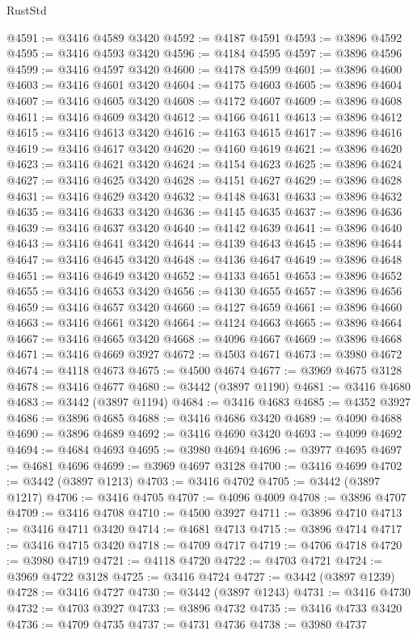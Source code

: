 \begin{lexlean}{RustStd}
\begin{coremodule}
@4591 := @3416 @4589 @3420
@4592 := @4187 @4591
@4593 := @3896 @4592
@4595 := @3416 @4593 @3420
@4596 := @4184 @4595
@4597 := @3896 @4596
@4599 := @3416 @4597 @3420
@4600 := @4178 @4599
@4601 := @3896 @4600
@4603 := @3416 @4601 @3420
@4604 := @4175 @4603
@4605 := @3896 @4604
@4607 := @3416 @4605 @3420
@4608 := @4172 @4607
@4609 := @3896 @4608
@4611 := @3416 @4609 @3420
@4612 := @4166 @4611
@4613 := @3896 @4612
@4615 := @3416 @4613 @3420
@4616 := @4163 @4615
@4617 := @3896 @4616
@4619 := @3416 @4617 @3420
@4620 := @4160 @4619
@4621 := @3896 @4620
@4623 := @3416 @4621 @3420
@4624 := @4154 @4623
@4625 := @3896 @4624
@4627 := @3416 @4625 @3420
@4628 := @4151 @4627
@4629 := @3896 @4628
@4631 := @3416 @4629 @3420
@4632 := @4148 @4631
@4633 := @3896 @4632
@4635 := @3416 @4633 @3420
@4636 := @4145 @4635
@4637 := @3896 @4636
@4639 := @3416 @4637 @3420
@4640 := @4142 @4639
@4641 := @3896 @4640
@4643 := @3416 @4641 @3420
@4644 := @4139 @4643
@4645 := @3896 @4644
@4647 := @3416 @4645 @3420
@4648 := @4136 @4647
@4649 := @3896 @4648
@4651 := @3416 @4649 @3420
@4652 := @4133 @4651
@4653 := @3896 @4652
@4655 := @3416 @4653 @3420
@4656 := @4130 @4655
@4657 := @3896 @4656
@4659 := @3416 @4657 @3420
@4660 := @4127 @4659
@4661 := @3896 @4660
@4663 := @3416 @4661 @3420
@4664 := @4124 @4663
@4665 := @3896 @4664
@4667 := @3416 @4665 @3420
@4668 := @4096 @4667
@4669 := @3896 @4668
@4671 := @3416 @4669 @3927
@4672 := @4503 @4671
@4673 := @3980 @4672
@4674 := @4118 @4673
@4675 := @4500 @4674
@4677 := @3969 @4675 @3128
@4678 := @3416 @4677
@4680 := @3442 (@3897 @1190)
@4681 := @3416 @4680
@4683 := @3442 (@3897 @1194)
@4684 := @3416 @4683
@4685 := @4352 @3927
@4686 := @3896 @4685
@4688 := @3416 @4686 @3420
@4689 := @4090 @4688
@4690 := @3896 @4689
@4692 := @3416 @4690 @3420
@4693 := @4099 @4692
@4694 := @4684 @4693
@4695 := @3980 @4694
@4696 := @3977 @4695
@4697 := @4681 @4696
@4699 := @3969 @4697 @3128
@4700 := @3416 @4699
@4702 := @3442 (@3897 @1213)
@4703 := @3416 @4702
@4705 := @3442 (@3897 @1217)
@4706 := @3416 @4705
@4707 := @4096 @4009
@4708 := @3896 @4707
@4709 := @3416 @4708
@4710 := @4500 @3927
@4711 := @3896 @4710
@4713 := @3416 @4711 @3420
@4714 := @4681 @4713
@4715 := @3896 @4714
@4717 := @3416 @4715 @3420
@4718 := @4709 @4717
@4719 := @4706 @4718
@4720 := @3980 @4719
@4721 := @4118 @4720
@4722 := @4703 @4721
@4724 := @3969 @4722 @3128
@4725 := @3416 @4724
@4727 := @3442 (@3897 @1239)
@4728 := @3416 @4727
@4730 := @3442 (@3897 @1243)
@4731 := @3416 @4730
@4732 := @4703 @3927
@4733 := @3896 @4732
@4735 := @3416 @4733 @3420
@4736 := @4709 @4735
@4737 := @4731 @4736
@4738 := @3980 @4737

\end{coremodule}
\end{lexlean}
